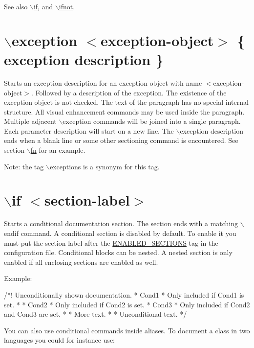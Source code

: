 \begin{DoxySeeAlso}{See also}
\hyperlink{commands_cmdif}{$\backslash$if}, and \hyperlink{commands_cmdifnot}{$\backslash$ifnot}.
\end{DoxySeeAlso}


 \hypertarget{commands_cmdexception}{}\section{$\backslash$exception $<$exception-\/object$>$ \{ exception description \}}\label{commands_cmdexception}
 Starts an exception description for an exception object with name $<$exception-\/object$>$. Followed by a description of the exception. The existence of the exception object is not checked. The text of the paragraph has no special internal structure. All visual enhancement commands may be used inside the paragraph. Multiple adjacent $\backslash$exception commands will be joined into a single paragraph. Each parameter description will start on a new line. The $\backslash$exception description ends when a blank line or some other sectioning command is encountered. See section \hyperlink{commands_cmdfn}{$\backslash$fn} for an example.

\begin{DoxyParagraph}{Note: }
the tag $\backslash$exceptions is a synonym for this tag.
\end{DoxyParagraph}


 \hypertarget{commands_cmdif}{}\section{$\backslash$if $<$section-\/label$>$}\label{commands_cmdif}
 Starts a conditional documentation section. The section ends with a matching {\ttfamily $\backslash$endif} command. A conditional section is disabled by default. To enable it you must put the section-\/label after the \hyperlink{config_cfg_enabled_sections}{ENABLED\_\-SECTIONS} tag in the configuration file. Conditional blocks can be nested. A nested section is only enabled if all enclosing sections are enabled as well.

\begin{DoxyParagraph}{Example:}
\begin{DoxyVerb}
  /*! Unconditionally shown documentation.
   *  \if Cond1
   *    Only included if Cond1 is set.
   *  \endif
   *  \if Cond2
   *    Only included if Cond2 is set.
   *    \if Cond3
   *      Only included if Cond2 and Cond3 are set.
   *    \endif
   *    More text.
   *  \endif
   *  Unconditional text.
   */
\end{DoxyVerb}

\end{DoxyParagraph}
You can also use conditional commands inside aliases. To document a class in two languages you could for instance use:

